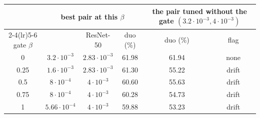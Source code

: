 \begin{tabular}{@{}c cc c cc@{}}
\toprule
 & \multicolumn{3}{c}{best pair at this $\beta$} & \multicolumn{2}{c}{the pair tuned without the gate $(3.2{\cdot}10^{-3}, 4{\cdot}10^{-3})$} \\
\cmidrule(lr){2-4}\cmidrule(lr){5-6}
gate $\beta$ & \vit{} & ResNet-50 & duo (\%) & duo (\%) & flag \\
\midrule
0 & $3.2{\cdot}10^{-3}$ & $2.83{\cdot}10^{-3}$ & 61.98 & 61.94 & none \\
0.25 & $1.6{\cdot}10^{-3}$ & $2.83{\cdot}10^{-3}$ & 61.30 & 55.22 & drift \\
0.5 & $8{\cdot}10^{-4}$ & $4{\cdot}10^{-3}$ & 60.60 & 55.63 & drift \\
0.75 & $8{\cdot}10^{-4}$ & $4{\cdot}10^{-3}$ & 60.28 & 54.73 & drift \\
1 & $5.66{\cdot}10^{-4}$ & $4{\cdot}10^{-3}$ & 59.88 & 53.23 & drift \\
\bottomrule
\end{tabular}

